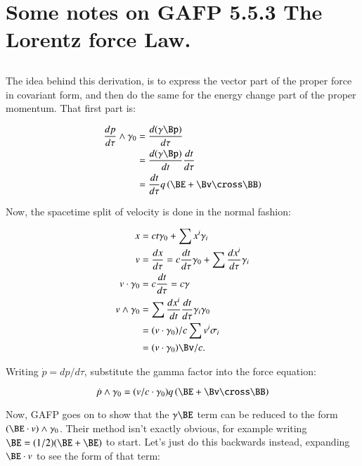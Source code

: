 
\chapter{Some notes on GAFP 5.5.3 The Lorentz force Law.}

\section{}

The idea behind this derivation, is to express the vector part of the proper force in covariant form, and then
do the same for the energy change part of the proper momentum.  That first part is:

\begin{align*}
\frac{dp}{d\tau} \wedge \gamma_0
&= \frac{d (\gamma \Bp)}{d\tau} \\
&= \frac{d (\gamma \Bp)}{dt} \frac{dt}{d\tau} \\
&= \frac{dt}{d\tau} q \left( \BE + \Bv \cross \BB \right)
\end{align*}

Now, the spacetime split of velocity is done in the normal fashion:

\begin{align*}
x &= c t \gamma_0 + \sum x^i \gamma_i \\
v &= \frac{dx}{d\tau} = c \frac{dt}{d\tau} \gamma_0 + \sum \frac{dx^i}{d\tau} \gamma_i \\
v \cdot \gamma_0 &= c \frac{dt}{d\tau} = c \gamma \\
v \wedge \gamma_0
&= \sum \frac{dx^i}{dt} \frac{dt}{d\tau} \gamma_i \gamma_0 \\
&= (v \cdot \gamma_0)/c \sum v^i \sigma_i \\
&= (v \cdot \gamma_0) \Bv/c.
\end{align*}

Writing $\dot{p} = dp/d\tau$, substitute the gamma factor into the force equation:

\begin{equation*}
\dot{p} \wedge \gamma_0 = ( v/c \cdot \gamma_0 ) q \left( \BE + \Bv \cross \BB \right)
\end{equation*}

Now, GAFP goes on to show that the $\gamma \BE$ term can be reduced to the form $(\BE \cdot v) \wedge \gamma_0$.  Their
method isn't exactly obvious, for example writing $\BE = (1/2)(\BE + \BE)$ to start.  Let's just do this backwards
instead, expanding $\BE \cdot v$ to see the form of that term:


